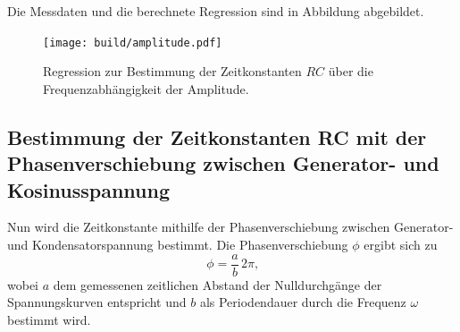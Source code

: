 Die Messdaten und die berechnete Regression sind in Abbildung  abgebildet.
\begin{figure}
	\centering
	\texttt{[image: build/amplitude.pdf]}
	\caption{Regression zur Bestimmung der Zeitkonstanten $RC$ über die Frequenzabhängigkeit der Amplitude.}
	\label{fig:plotb}
\end{figure}

\subsection{Bestimmung der Zeitkonstanten RC mit der Phasenverschiebung zwischen Generator- und Kosinusspannung}

Nun wird die Zeitkonstante mithilfe der Phasenverschiebung zwischen Generator- und Kondensatorspannung bestimmt.
Die Phasenverschiebung $\phi$ ergibt sich zu
\begin{equation*}
	\phi = \frac{a}{b} \, 2\pi \text{,}
\end{equation*}
wobei $a$ dem gemessenen zeitlichen Abstand der Nulldurchgänge der Spannungskurven entspricht und $b$ als Periodendauer durch die Frequenz $\omega$ bestimmt wird.

